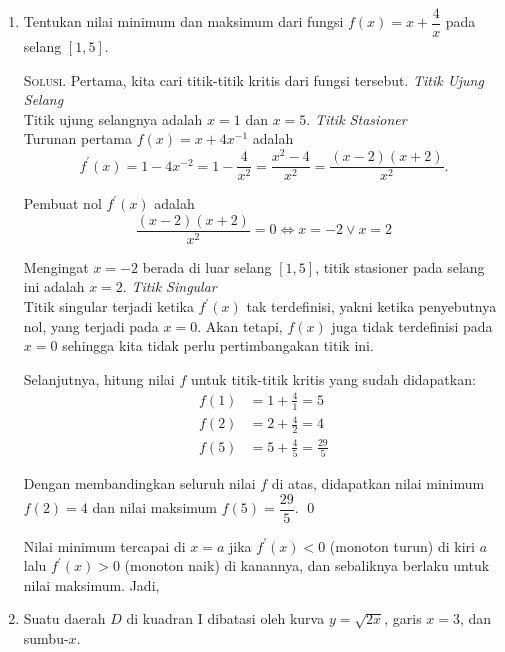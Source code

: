 \documentclass{exam}
\newcounter{hitung}
\renewenvironment{proof}[1][Solusi.]{\ProofBox\strut\textsc{#1}\space}{\endProofBox}
\numberwithin{equation}{section}
\begin{document}
\begin{enumerate}
    
    \item Tentukan nilai minimum dan maksimum dari fungsi $f(x) = x + \dfrac{4}{x}$ pada selang $[1,5]$.

    \begin{proof}
        Pertama, kita cari titik-titik kritis dari fungsi tersebut.
        \textit{Titik Ujung Selang}\\
        Titik ujung selangnya adalah $x = 1$ dan $x = 5$.
        \textit{Titik Stasioner}\\
        Turunan pertama $f(x) = x + 4x^{-1}$ adalah
        \[f^\prime(x) = 1 - 4x^{-2} = 1 - \frac{4}{x^2} = \frac{x^2 - 4}{x^2} = \frac{(x-2)(x+2)}{x^2}.\]

        Pembuat nol $f^\prime(x)$ adalah
            \[\frac{(x-2)(x+2)}{x^2} = 0 \iff x = -2 \lor x = 2 \]

        Mengingat $x = -2$ berada di luar selang $[1,5]$, titik stasioner pada selang ini adalah $x = 2$.
        \textit{Titik Singular}\\
        Titik singular terjadi ketika $f^\prime(x)$ tak terdefinisi, yakni ketika penyebutnya nol, yang terjadi pada $x = 0$. Akan tetapi, $f(x)$ juga tidak terdefinisi pada $x = 0$ sehingga kita tidak perlu pertimbangakan titik ini.

        Selanjutnya, hitung nilai $f$ untuk titik-titik kritis yang sudah didapatkan:
        \begin{align*}
            f(1)    &= 1 + \frac{4}{1}      = 5             \\
            f(2)    &= 2 + \frac{4}{2}      = 4             \\
            f(5)    &= 5 + \frac{4}{5}      = \frac{29}{5}
        \end{align*}

        Dengan membandingkan seluruh nilai $f$ di atas, didapatkan nilai minimum $f(2) = 4$ dan nilai maksimum $f(5) = \dfrac{29}{5}$. \qed
        
    \end{proof}\vspace{1em}

    Nilai minimum tercapai di $x = a$ jika $f^\prime(x) < 0$ (monoton turun) di kiri $a$ lalu $f^\prime(x) > 0$ (monoton naik) di kanannya, dan sebaliknya berlaku untuk nilai maksimum. Jadi,

    
    \item Suatu daerah $D$ di kuadran I dibatasi oleh kurva $y = \sqrt{2x}$, garis $x = 3$, dan sumbu-$x$.
    

\end{enumerate}
\end{document}
